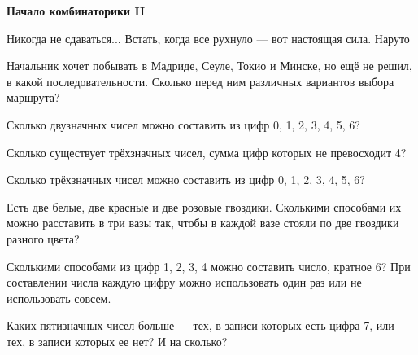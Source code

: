 \centerline{\bf \Huge Начало комбинаторики II}

\begin{flushright}
        \scriptsize{Никогда не сдаваться... Встать, когда все рухнуло — вот настоящая сила. Наруто}
\end{flushright}

 Начальник хочет побывать в Мадриде, Сеуле, Токио и Минске, но ещё не решил, в какой
последовательности. Сколько перед ним различных вариантов выбора маршрута?

 Сколько двузначных чисел можно составить из цифр 0, 1, 2, 3, 4, 5, 6?

 Сколько существует трёхзначных чисел, сумма цифр которых не превосходит 4?

 Сколько трёхзначных чисел можно составить из цифр 0, 1, 2, 3, 4, 5, 6?

  Есть две белые, две красные и две розовые гвоздики. Сколькими способами их можно
расставить в три вазы так, чтобы в каждой вазе стояли по две гвоздики разного цвета?

  Сколькими способами из цифр 1, 2, 3, 4 можно составить
число, кратное 6? При составлении числа каждую цифру можно использовать один раз или не
использовать совсем.

 Каких пятизначных чисел больше — тех, в записи которых есть цифра 7, или тех, в записи которых ее нет? И на сколько?